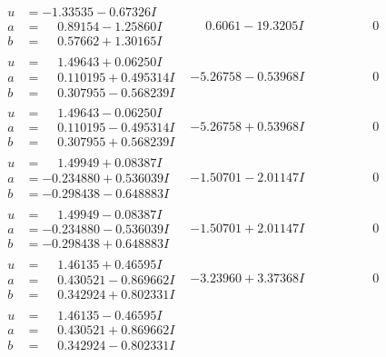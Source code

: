\documentclass[1p]{elsarticle_modified}
\theoremstyle{definition}
\begin{document}
$$\begin{array}{c|c|c}
\begin{aligned}
u &= -1.33535 - 0.67326 I \\
a &= \phantom{-}0.89154 - 1.25860 I \\
b &= \phantom{-}0.57662 + 1.30165 I\end{aligned}
 & \phantom{-}0.6061 - 19.3205 I & \phantom{-0.000000 } 0 \\ \hline\begin{aligned}
u &= \phantom{-}1.49643 + 0.06250 I \\
a &= \phantom{-}0.110195 + 0.495314 I \\
b &= \phantom{-}0.307955 - 0.568239 I\end{aligned}
 & -5.26758 - 0.53968 I & \phantom{-0.000000 } 0 \\ \hline\begin{aligned}
u &= \phantom{-}1.49643 - 0.06250 I \\
a &= \phantom{-}0.110195 - 0.495314 I \\
b &= \phantom{-}0.307955 + 0.568239 I\end{aligned}
 & -5.26758 + 0.53968 I & \phantom{-0.000000 } 0 \\ \hline\begin{aligned}
u &= \phantom{-}1.49949 + 0.08387 I \\
a &= -0.234880 + 0.536039 I \\
b &= -0.298438 - 0.648883 I\end{aligned}
 & -1.50701 - 2.01147 I & \phantom{-0.000000 } 0 \\ \hline\begin{aligned}
u &= \phantom{-}1.49949 - 0.08387 I \\
a &= -0.234880 - 0.536039 I \\
b &= -0.298438 + 0.648883 I\end{aligned}
 & -1.50701 + 2.01147 I & \phantom{-0.000000 } 0 \\ \hline\begin{aligned}
u &= \phantom{-}1.46135 + 0.46595 I \\
a &= \phantom{-}0.430521 - 0.869662 I \\
b &= \phantom{-}0.342924 + 0.802331 I\end{aligned}
 & -3.23960 + 3.37368 I & \phantom{-0.000000 } 0 \\ \hline\begin{aligned}
u &= \phantom{-}1.46135 - 0.46595 I \\
a &= \phantom{-}0.430521 + 0.869662 I \\
b &= \phantom{-}0.342924 - 0.802331 I\end{aligned}

\end{array}$$
\end{document}
